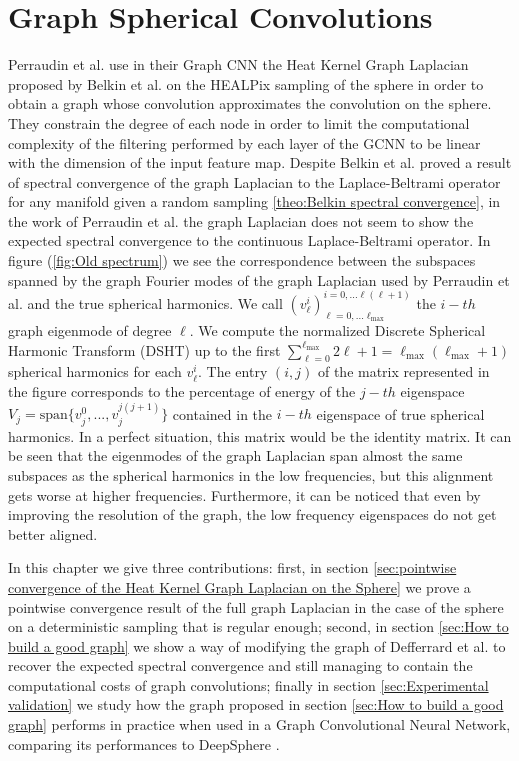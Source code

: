 

\section{Graph Spherical Convolutions}
Perraudin et al. \cite{DeepSphere} use in their Graph CNN the Heat Kernel Graph Laplacian proposed by Belkin et al. \cite{Belkin:2005:TTF:2138147.2138189} on the HEALPix sampling of the sphere in order to obtain a graph whose convolution approximates the convolution on the sphere. They constrain the degree of each node in order to limit the computational complexity of the filtering performed by each layer of the GCNN to be linear with the dimension of the input feature map. Despite Belkin et al. proved a result of spectral convergence of the graph Laplacian to the Laplace-Beltrami operator for any manifold given a random sampling \ref{theo:Belkin spectral convergence}, in the work of Perraudin et al. the graph Laplacian does not seem to show the expected spectral convergence to the continuous Laplace-Beltrami operator. In figure (\ref{fig:Old spectrum}) we see the correspondence between the subspaces spanned by the graph Fourier modes of the graph Laplacian used by Perraudin et al. and the true spherical harmonics. We call $(v_\ell^i)_{\ell=0,... \ell_\text{max}}^{i=0,...\ell(\ell+1)}$ the $i-th$ graph eigenmode of degree $\ell$. We compute the normalized Discrete Spherical Harmonic Transform (DSHT) up to the first $\sum_{\ell=0}^{\ell_\text{max}{}}2\ell + 1=\ell_{\text{max}}(\ell_\text{max}+1)$ spherical harmonics for each $v_\ell^i$. The entry $(i, j)$ of the matrix represented in the figure corresponds to the percentage of energy of the $j-th$ eigenspace $V_j = \text{span}\{v^0_j, ..., v^{j(j+1)}_j\}$ contained in the $i-th$ eigenspace of true spherical harmonics. In a perfect situation, this matrix would be the identity matrix. It can be seen that the eigenmodes of the graph Laplacian span almost the same subspaces as the spherical harmonics in the low frequencies, but this alignment gets worse at higher frequencies. Furthermore, it can be noticed that even by improving the resolution of the graph, the low frequency eigenspaces do not get better aligned.

In this chapter we give three contributions: first, in section \ref{sec:pointwise convergence of the Heat Kernel Graph Laplacian on the Sphere} we prove a pointwise convergence result of the full graph Laplacian in the case of the sphere on a deterministic sampling that is regular enough; second, in section \ref{sec:How to build a good graph} we show a way of modifying the graph of Defferrard et al. to recover the expected spectral convergence and still managing to contain the computational costs of graph convolutions; finally in section \ref{sec:Experimental validation} we study how the graph proposed in section \ref{sec:How to build a good graph} performs in practice when used in a Graph Convolutional Neural Network, comparing its performances to DeepSphere \cite{DeepSphere}.

